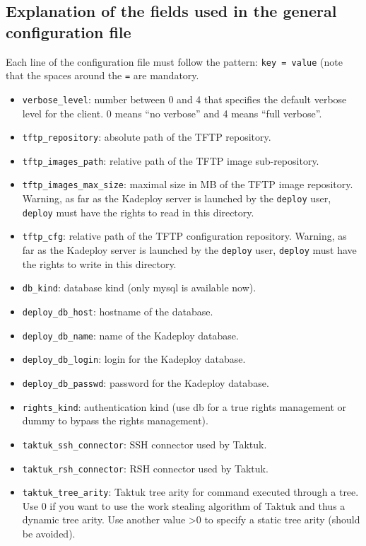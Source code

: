 \documentclass[a4wide,10pt,oneside]{book}
\begin{document}
\subsection{Explanation of the fields used in the general configuration file}
Each line of the configuration file must follow the pattern: \texttt{key = value} (note that the spaces around the \texttt{=} are mandatory.
\begin{itemize}
\item \texttt{verbose\_level}: number between 0 and 4 that specifies the default verbose level for the client. 0 means ``no verbose'' and 4 means ``full verbose''.
\item \texttt{tftp\_repository}: absolute path of the TFTP repository.
\item \texttt{tftp\_images\_path}: relative path of the TFTP image sub-repository.
\item \texttt{tftp\_images\_max\_size}: maximal size in MB of the TFTP image repository. Warning, as far as the Kadeploy server is launched by the \texttt{deploy} user, \texttt{deploy} must have the rights to read in this directory.
\item \texttt{tftp\_cfg}: relative path of the TFTP configuration repository. Warning, as far as the Kadeploy server is launched by the \texttt{deploy} user, \texttt{deploy} must have the rights to write in this directory.
\item \texttt{db\_kind}: database kind (only mysql is available now).
\item \texttt{deploy\_db\_host}: hostname of the database.
\item \texttt{deploy\_db\_name}: name of the Kadeploy database.
\item \texttt{deploy\_db\_login}: login for the Kadeploy database.
\item \texttt{deploy\_db\_passwd}: password for the Kadeploy database.
\item \texttt{rights\_kind}: authentication kind (use db for a true rights management or dummy to bypass the rights management).
\item \texttt{taktuk\_ssh\_connector}: SSH connector used by Taktuk.
\item \texttt{taktuk\_rsh\_connector}: RSH connector used by Taktuk.
\item \texttt{taktuk\_tree\_arity}: Taktuk tree arity for command executed through a tree. Use 0 if you want to use the work stealing algorithm of Taktuk and thus a dynamic tree arity. Use another value >0 to specify a static tree arity (should be avoided).

\end{itemize}
\end{document}
